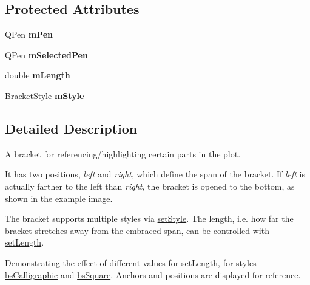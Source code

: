 \subsection*{\-Protected \-Attributes}
\begin{DoxyCompactItemize}
\item 
\hypertarget{classQCPItemBracket_a350c864a5853b04343719f5a8be6b675}{\-Q\-Pen {\bfseries m\-Pen}}\label{classQCPItemBracket_a350c864a5853b04343719f5a8be6b675}

\item 
\hypertarget{classQCPItemBracket_adcfb53602d1802d00e2de4fd6df6b291}{\-Q\-Pen {\bfseries m\-Selected\-Pen}}\label{classQCPItemBracket_adcfb53602d1802d00e2de4fd6df6b291}

\item 
\hypertarget{classQCPItemBracket_ab3d99bba8da18eb4d0e0cb23dded33b2}{double {\bfseries m\-Length}}\label{classQCPItemBracket_ab3d99bba8da18eb4d0e0cb23dded33b2}

\item 
\hypertarget{classQCPItemBracket_ac911907184c824d621f274f8e0990080}{\hyperlink{classQCPItemBracket_a7ac3afd0b24a607054e7212047d59dbd}{\-Bracket\-Style} {\bfseries m\-Style}}\label{classQCPItemBracket_ac911907184c824d621f274f8e0990080}

\end{DoxyCompactItemize}


\subsection{\-Detailed \-Description}
\-A bracket for referencing/highlighting certain parts in the plot. 

 \-It has two positions, {\itshape left\/} and {\itshape right\/}, which define the span of the bracket. \-If {\itshape left\/} is actually farther to the left than {\itshape right\/}, the bracket is opened to the bottom, as shown in the example image.

\-The bracket supports multiple styles via \hyperlink{classQCPItemBracket_a612dffa2373422eef8754d690add3703}{set\-Style}. \-The length, i.\-e. how far the bracket stretches away from the embraced span, can be controlled with \hyperlink{classQCPItemBracket_ac7cfc3da7da9b5c5ac5dfbe4f0351b2a}{set\-Length}.

 \begin{center}\-Demonstrating the effect of different values for \hyperlink{classQCPItemBracket_ac7cfc3da7da9b5c5ac5dfbe4f0351b2a}{set\-Length}, for styles \hyperlink{classQCPItemBracket_a7ac3afd0b24a607054e7212047d59dbda8f29f5ef754e2dc9a9efdedb2face0f3}{bs\-Calligraphic} and \hyperlink{classQCPItemBracket_a7ac3afd0b24a607054e7212047d59dbda7f9df4a7359bfe3dac1dbe4ccf5d220c}{bs\-Square}. \-Anchors and positions are displayed for reference.\end{center} 

